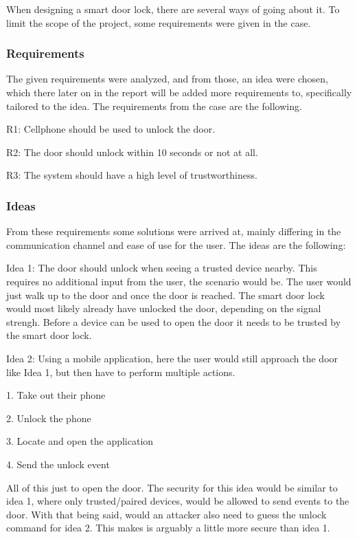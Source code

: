 When designing a smart door lock, there are several ways of going about it.
To limit the scope of the project, some requirements were given in the case.

\subsubsection{Requirements}
The given requirements were analyzed, and from those, an idea were chosen, which there later on in the report will be added more requirements to, specifically tailored to the idea.
The requirements from the case are the following.
\newline

R1: Cellphone should be used to unlock the door.

R2: The door should unlock within 10 seconds or not at all.

R3: The system should have a high level of trustworthiness.

\subsubsection{Ideas}
From these requirements some solutions were arrived at, mainly differing in the communication channel and ease of use for the user.
The ideas are the following:


Idea 1: The door should unlock when seeing a trusted device nearby.
This requires no additional input from the user, the scenario would be. The user would just walk up to the door and once the door is reached.
The smart door lock would most likely already have unlocked the door, depending on the signal strengh.
Before a device can be used to open the door it needs to be trusted by the smart door lock.

Idea 2: Using a mobile application, here the user would still approach the door like Idea 1, but then have to perform multiple actions.
\newline

1. Take out their phone

2. Unlock the phone

3. Locate and open the application

4. Send the unlock event

All of this just to open the door.
The security for this idea would be similar to idea 1, where only trusted/paired devices, would be allowed to send events to the door. With that being said, would an attacker also need to guess the unlock command for idea 2. This makes is arguably a little more secure than idea 1.

